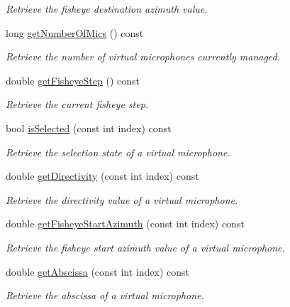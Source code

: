 \begin{DoxyCompactItemize}
\begin{DoxyCompactList}\small\item\em Retrieve the fisheye destination azimuth value. \end{DoxyCompactList}\item 
long \hyperlink{class_hoa2_d_1_1_virtual_mic_manager_accfd94e543f908e703cabd4829c42ae0}{get\-Number\-Of\-Mics} () const 
\begin{DoxyCompactList}\small\item\em Retrieve the number of virtual microphones currently managed. \end{DoxyCompactList}\item 
double \hyperlink{class_hoa2_d_1_1_virtual_mic_manager_a8d211940759074053682e1ca119f05fd}{get\-Fisheye\-Step} () const 
\begin{DoxyCompactList}\small\item\em Retrieve the current fisheye step. \end{DoxyCompactList}\item 
bool \hyperlink{class_hoa2_d_1_1_virtual_mic_manager_a81228c748207a601761eee6c2c999c31}{is\-Selected} (const int index) const 
\begin{DoxyCompactList}\small\item\em Retrieve the selection state of a virtual microphone. \end{DoxyCompactList}\item 
double \hyperlink{class_hoa2_d_1_1_virtual_mic_manager_add79d3cfea68de215e2be864d302a19c}{get\-Directivity} (const int index) const 
\begin{DoxyCompactList}\small\item\em Retrieve the directivity value of a virtual microphone. \end{DoxyCompactList}\item 
double \hyperlink{class_hoa2_d_1_1_virtual_mic_manager_ae01486ff891cd4e6e3951beed0680d81}{get\-Fisheye\-Start\-Azimuth} (const int index) const 
\begin{DoxyCompactList}\small\item\em Retrieve the fisheye start azimuth value of a virtual microphone. \end{DoxyCompactList}\item 
double \hyperlink{class_hoa2_d_1_1_virtual_mic_manager_a641578b9c0a40bde63de09228dd03f84}{get\-Abscissa} (const int index) const 
\begin{DoxyCompactList}\small\item\em Retrieve the abscissa of a virtual microphone. \end{DoxyCompactList}\item 

\end{DoxyCompactItemize}
